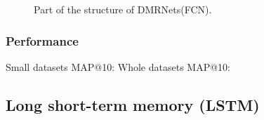 \documentclass{article}
\begin{document}
 \begin{figure} [H]
  \centering
  \caption{Part of the structure of DMRNets(FCN).}
\end{figure}

\subsubsection{Performance}
Small datasets MAP@10: 
Whole datasets MAP@10: 

\subsection{Long short-term memory (LSTM)}
\end{document}
